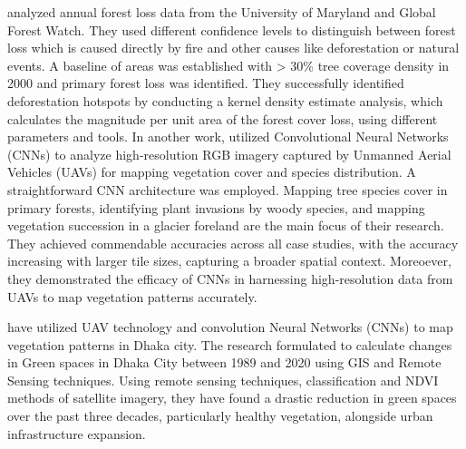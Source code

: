  
  analyzed annual forest loss data from the University of Maryland and Global Forest Watch. They used different confidence levels to distinguish between forest loss which is caused directly by fire and other causes like deforestation or natural events. A baseline of areas was established with > 30\% tree coverage density in 2000 and primary forest loss was identified. %
They successfully identified deforestation hotspots by conducting a kernel density estimate analysis, which calculates the magnitude per unit area of the forest cover loss, using different parameters and tools.
\newline
In another work,  utilized Convolutional Neural Networks (CNNs) to analyze high-resolution RGB imagery captured by Unmanned Aerial Vehicles (UAVs) for mapping vegetation cover and species distribution. A straightforward CNN architecture was employed. Mapping tree species cover in primary forests, identifying plant invasions by woody species, and mapping vegetation succession in a glacier foreland are the main focus of their research. They achieved commendable accuracies across all case studies, with the accuracy increasing with larger tile sizes, capturing a broader spatial context. Moreoever, they demonstrated the efficacy of CNNs in harnessing high-resolution data from UAVs to map vegetation patterns accurately.


 have utilized UAV technology and convolution Neural Networks (CNNs) to map vegetation patterns in Dhaka city. The research formulated to calculate changes in Green spaces in Dhaka City between 1989 and 2020 using GIS and Remote Sensing techniques. 
Using remote sensing techniques, classification and NDVI methods of satellite imagery, they have found a drastic reduction in green spaces over the past three decades, particularly healthy vegetation, alongside urban infrastructure expansion.



